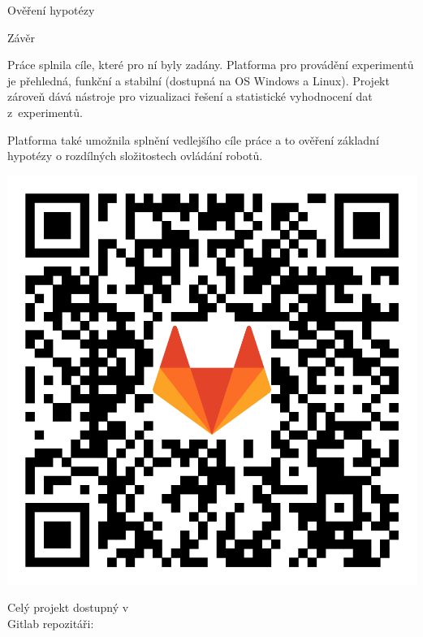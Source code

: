 \documentclass[portrait,a0paper,fontscale=0.25]{baposter}
\begin{document}
\begin{poster}
\begin{posterbox}[column=1, name=result2, below=result1]{Ověření hypotézy}
\end{posterbox}

\begin{posterbox}[column=1, name=conclusion, below=result2, bottomaligned=something1]{Závěr}

Práce splnila cíle, které pro ní byly zadány. Platforma pro provádění
experimentů je přehledná, funkční a stabilní \linebreak (dostupná na OS Windows a Linux).
Projekt zároveň dává nástroje pro vizualizaci řešení a statistické vyhodnocení
dat z~experimentů.

Platforma také umožnila splnění vedlejšího cíle práce a to ověření základní
hypotézy o rozdílných složitostech ovládání robotů.

\begin{center}
    \hspace{100px}
    \includegraphics[width=0.3\linewidth]{../../BP/img/QRGitlab.png}

    \vspace{-57px} %
    \hspace{-110px} %
    Celý projekt dostupný v \\ \hspace{-100px}Gitlab repozitáři:
\end{center}
\end{posterbox}


\end{poster}
\end{document}
